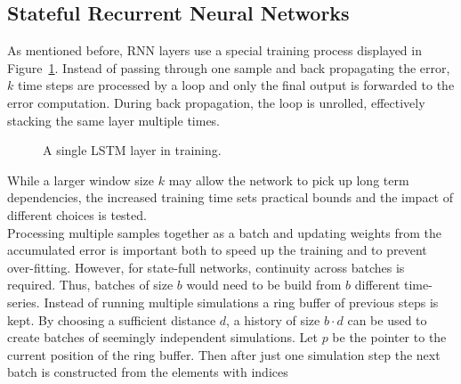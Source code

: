 \documentclass[sigconf]{acmart}
\begin{document}
\subsection{Stateful Recurrent Neural Networks}
As mentioned before, RNN layers use a special training process displayed in Figure~\ref{rnnTraining}. Instead of passing through one sample and back propagating the error, $k$ time steps are processed by a loop and only the final output is forwarded to the error computation. During back propagation, the loop is unrolled, effectively stacking the same layer multiple times. 
\begin{figure}
	\caption{A single LSTM layer in training.}
	\label{rnnTraining}
\end{figure}
While a larger window size $k$ may allow the network to pick up long term dependencies, the increased training time sets practical bounds and the impact of different choices is tested.\\
Processing multiple samples together as a batch and updating weights from the accumulated error is important both to speed up the training and to prevent over-fitting. However, for state-full networks, continuity across batches is required. Thus, batches of size $b$ would need to be build from $b$ different time-series. Instead of running multiple simulations a ring buffer of previous steps is kept. By choosing a sufficient distance $d$, a history of size $b \cdot d$ can be used to create batches of seemingly independent simulations. Let $p$ be the pointer to the current position of the ring buffer. Then after just one simulation step the next batch is constructed from the elements with indices
\end{document}
